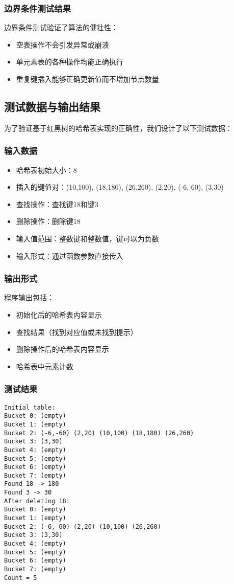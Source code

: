 \documentclass[12pt,a4paper]{article}
\begin{document}
\subsubsection{边界条件测试结果}
边界条件测试验证了算法的健壮性：
\begin{itemize}
\item 空表操作不会引发异常或崩溃
\item 单元素表的各种操作均能正确执行
\item 重复键插入能够正确更新值而不增加节点数量
\end{itemize}

\subsection{测试数据与输出结果}
为了验证基于红黑树的哈希表实现的正确性，我们设计了以下测试数据：

\subsubsection{输入数据}
\begin{itemize}
\item 哈希表初始大小：8
\item 插入的键值对：(10,100), (18,180), (26,260), (2,20), (-6,-60), (3,30)
\item 查找操作：查找键18和键3
\item 删除操作：删除键18
\item 输入值范围：整数键和整数值，键可以为负数
\item 输入形式：通过函数参数直接传入
\end{itemize}

\subsubsection{输出形式}
程序输出包括：
\begin{itemize}
\item 初始化后的哈希表内容显示
\item 查找结果（找到对应值或未找到提示）
\item 删除操作后的哈希表内容显示
\item 哈希表中元素计数
\end{itemize}

\subsubsection{测试结果}
\begin{verbatim}
Initial table:
Bucket 0: (empty)
Bucket 1: (empty)
Bucket 2: (-6,-60) (2,20) (10,100) (18,180) (26,260) 
Bucket 3: (3,30) 
Bucket 4: (empty)
Bucket 5: (empty)
Bucket 6: (empty)
Bucket 7: (empty)
Found 18 -> 180
Found 3 -> 30
After deleting 18:
Bucket 0: (empty)
Bucket 1: (empty)
Bucket 2: (-6,-60) (2,20) (10,100) (26,260) 
Bucket 3: (3,30) 
Bucket 4: (empty)
Bucket 5: (empty)
Bucket 6: (empty)
Bucket 7: (empty)
Count = 5
\end{verbatim}
\end{document}

